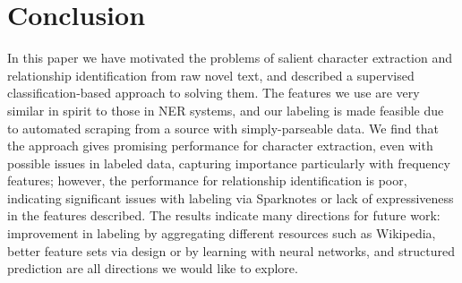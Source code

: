 \documentclass[12pt]{article}
\begin{document}
\section{Conclusion}

    In this paper we have motivated the problems of salient character extraction and relationship
    identification from raw novel text, and described a supervised classification-based approach to
    solving them. The features we use are very similar in spirit to those in NER systems,
    and our labeling is made feasible due to automated scraping from a source with simply-parseable
    data. We find that the approach gives promising performance for character extraction,
    even with possible issues in labeled data, capturing importance particularly with frequency
    features; however, the performance for relationship identification is poor, indicating
    significant issues with labeling via Sparknotes or lack of expressiveness in the features
    described. The results indicate many directions for future work: improvement in labeling
    by aggregating different resources such as Wikipedia, better feature sets via design or by
    learning with neural networks, and structured prediction are all directions we would like
    to explore.



\end{document}
